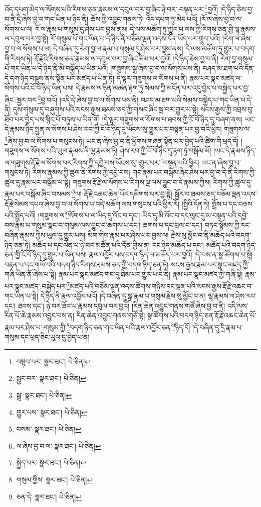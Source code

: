 འོད་དཔག་མེད་ལ་སོགས་པའི་རིགས་ཅན་རྣམས་ལ་དབུལ་བར་བྱ་ཞིང་ཉེ་བར་:བསྟན་པར་\footnote{བསྟབ་པར་  སྣར་ཐང་།  པེ་ཅིན། }བྱའོ། །དེ་ཉིད་ཅེས་བྱ་བ་ནི་དྲི་ཞེས་བྱ་བ་གང་ཡིན་པ་ཉིད་ནི། ཆོས་ཀྱི་འབྱུང་གནས་ཏེ། འོད་དཔག་ཏུ་མེད་པའོ། །རོ་ལ་ཞེས་བྱ་བ་ལ་སོགས་པ་ལ། རོ་ལ་རྣམ་པ་གསུམ་དུ་ཤེས་པར་བྱས་ནས། དེ་ལས་མཆོག་ཏུ་གྱུར་པ་ལས་ཀྱི་རིགས་ཅན་གྱི་ལྷ་རྣམས་ལ་དབུལ་བར་བྱ་སྟེ། རོ་གསུམ་པོ་གང་ཡིན་པ་དེ་ཉིད་ནི་བཅོམ་ལྡན་འདས་དོན་ཡོད་པར་གྲུབ་པའོ། །རེག་ལ་ཞེས་བྱ་བ་ལ་སོགས་པ་ལ། དེ་བཞིན་དུ་རེག་བྱ་ལ་རྣམ་པ་གསུམ་དུ་ཤེས་པར་བྱས་ནས། དེ་ལས་མཆོག་ཏུ་གྱུར་པ་བདག་གི་རིགས་ཏེ། རྡོ་རྗེའི་རིགས་ཅན་རྣམས་ལ་དབུལ་བར་བྱ་ཞིང་ཚིམ་པར་བྱའོ། །དེ་ཉིད་ཅེས་བྱ་བ་ནི། རེག་བྱ་གསུམ་པོ་གང་ཡིན་པ་དེ་ཉིད་ནི་མི་བསྐྱོད་པ་ཡིན་པའོ། །གཟུགས་སྒྲ་ཞེས་བྱ་བ་ལ་སོགས་པས་ནི། བཤད་མ་ཐག་པའི་དོན་དེ་དག་ཉིད་བསྡུས་ནས་སྟོན་པར་མཛད་པ་ཡིན་ཏེ། དེ་ལྟར་གཟུགས་ལ་སོགས་པ་ནི། རྣམ་པར་སྣང་མཛད་ལ་སོགས་པའི་ངོ་བོ་ཉིད་ཡིན་པས། དེ་རྣམས་ལ་ཉིན་མཚན་རྟག་ཏུ་སེམས་ཀྱི་མངོན་པར་འདུ་བྱེད་པ་བསྐྱེད་པར་བྱ་ཞིང་:སྦྱར་བར་\footnote{སྦྱང་བར་  སྣར་ཐང་།  པེ་ཅིན། }བྱ་བའོ། །འདི་དེ་ཞེས་བྱ་བ་ལ་སོགས་པས་ནི། བཤད་མ་ཐག་པའི་སེམས་བསྐྱེད་པ་གང་ཡིན་པ་དེ་ནི། དུས་གསུམ་དུ་བཞུགས་པའི་སངས་རྒྱས་ཐམས་ཅད་ཀྱི་གསང་ཞིང་སྦ་བར་གྱུར་པ་སྟེ། སངས་རྒྱས་ཀྱི་འབྲས་བུ་ཐོབ་པར་བྱེད་པས་སྙིང་པོ་བཏུས་པ་ཡིན་ནོ། །དེ་ལྟར་གཟུགས་ལ་སོགས་པ་ཐབས་ཀྱི་ངོ་བོ་ཉིད་དུ་བཞག་ནས། ཡང་དེ་རྣམས་ཉིད་སྤྱན་ལ་སོགས་པ་ཤེས་རབ་ཀྱི་ངོ་བོ་ཉིད་དུ་ཡོངས་སུ་གྱུར་པར་བསྟན་པར་བྱ་བའི་ཕྱིར། གཟུགས་ལ་\footnote{སྒྲ་  སྣར་ཐང་།  པེ་ཅིན། }ཞེས་བྱ་བ་ལ་སོགས་པ་གསུངས་ཏེ། ཡང་ན་ཞེས་བྱ་བ་ནི་ཕྱོགས་གཞན་སྟོན་པར་བྱེད་པའི་ཚིག་གི་ཕྲད་དོ། །གཟུགས་ལ་སོགས་པའི་ཡུལ་རྣམས་ནི་ལྷ་རྣམས་ཏེ། ཤེས་རབ་ཀྱི་ངོ་བོ་ཉིད་དུ་རྟག་ཏུ་བསྒོམ་མོ། །ཡང་དེ་རྣམས་ཉིད་ལ་གཟུགས་རྡོ་རྗེ་ལ་སོགས་པར་རིགས་ཀྱི་དབྱེ་བས་ཡོངས་སུ་:གྱུར་པར་\footnote{གྱུར་པས་  སྣར་ཐང་།  པེ་ཅིན། }བསྟན་པའི་ཕྱིར། ཡང་ན་ཞེས་བྱ་བ་གསུངས་ཏེ། རིགས་རྣམས་ཀྱི་ཚུལ་ནི་རིགས་ཀྱི་དབྱེ་བས། གང་རྣམ་པར་བསྒོམ་ཞིང་ཤེས་པར་བྱ་བ་དེ་ནི་རིགས་ཀྱི་ཚུལ་དུ་རྣམ་པར་བསྒོམ་པ་སྟེ། གཟུགས་རྡོ་རྗེ་ལ་སོགས་པ་རིགས་ལྔ་ལས་བྱུང་བ་དེ་རྣམས་ཀྱིས། རིགས་ཀྱི་ཚུལ་དུ་རྣམ་པར་བསྒོམ་ཞིང་བསམས་\footnote{བསམ་  སྣར་ཐང་།  པེ་ཅིན། }ལ། རྡོ་རྗེ་འཆང་ཆེན་པོར་དམིགས་པར་བྱ་སྟེ། སྦྱོར་བ་ཐམས་ཅད་བཅོམ་ལྡན་འདས་རྡོ་རྗེ་སེམས་དཔའ་ཞེས་བྱ་བ་ལ་སོགས་པ་བདེ་མཆོག་ལས་གསུངས་པའི་ཕྱིར་རོ། །སྤྱིའི་དོན་ཏེ། སྤྲོས་པ་དང་བཅས་པའི་སྤྱོད་པའོ། །གཟུགས་ལ་\footnote{ལ་ཞེས་བྱ་བ་ལ་  སྣར་ཐང་།  པེ་ཅིན། }སོགས་པ་ལ་ཡིད་དུ་འོང་བ་དང་། ཡིད་དུ་མི་འོང་བ་དང་ལུང་དུ་མ་བསྟན་པའི་དབྱེ་བས་རྣམ་པ་གསུམ་སྣང་བ་གསུམ་ལས་བྱུང་བ་ཆགས་པ་དང་། ཆགས་པ་དང་བྲལ་བ་དང་། བཏང་སྙོམས་ཀྱི་རང་བཞིན་རྣམས་ཀྱིས་ཡུལ་དུ་གྱུར་པས། མིག་གིས་རྣམ་པར་ཤེས་པར་བྱས་ལ། རྗེས་སུ་མྱོང་བ་ནི་མཆོད་པའི་བདག་ཉིད་ཅན་ཏེ། མཆོད་པ་དང་ལེན་པ་ཉེ་བར་མཚོན་པའི་དོན་གྱིས་ན། རང་ཉིད་མཆོད་པ་དང་། མཆོད་པའི་བདག་ཉིད་ཅན་གྱི་ངོ་བོ་ཉིད་དུ་གྱུར་པ་ཡིན་པས། རྣལ་འབྱོར་པས་བདག་ཉིད་ལ་མཆོད་པར་བྱའོ། །དེ་བས་ན་སྣ་ཚོགས་པ་སྟེ། བརྟན་པ་དང་གཡོ་བའི་བདག་ཉིད་རིགས་ཐམས་ཅད་ཀྱི་བདག་ཉིད་ཅན་ཏེ། སངས་རྒྱས་རྣམ་པར་སྣང་མཛད་ཀྱི་གཞི་ཡིན་ནོ་ཞེས་པ་སྟེ། རྣམ་པར་སྣང་མཛད་གང་དུ་ཐིམ་པར་གྱུར་པ་དེ་ནི། རྣམ་པར་སྣང་མཛད་ཀྱི་གཞི་སྟེ། རྣམ་པར་སྣང་མཛད་:བསྐྱེད་པར་\footnote{སྐྱེད་པར་  སྣར་ཐང་།  པེ་ཅིན། }མཛད་པའི་བཅོམ་ལྡན་འདས་ཚོགས་གཉིས་དང་ལྡན་པའི་སངས་རྒྱས་རྡོ་རྗེ་འཆང་བ་གང་ཡིན་པ་སྟེ། དེ་ཉིད་ནི་རྣལ་འབྱོར་པའོ། །དེ་བཞིན་དུ་སྒྲ་རྣམ་པ་གསུམ་རྗེས་སུ་མྱོང་བ་ན། ལྷ་རྣམས་ལ་ཤེས་རབ་དང་། ཐབས་དང་། ཉེ་བར་ཐོབ་པ་རྣམས་དབུལ་བར་བྱའོ། །རིན་ཆེན་འབྱུང་གནས་གཙོ་ཞེས་བྱ་བ་ནི། འདི་ལས་རིན་པོ་ཆེ་རྣམས་འབྱུང་བས་ན། རིན་ཆེན་འབྱུང་གནས་གཙོ་སྟེ། སྣ་ཚོགས་པའི་བདག་ཉིད་ཅན་རྡོ་རྗེ་འཆང་ཆེན་པོ་རྣམ་པར་ཤེས་པ་:གསུམ་གྱི་\footnote{གསུམ་གྱིས་  སྣར་ཐང་།  པེ་ཅིན། }བདག་ཉིད་ཅན་གང་ཡིན་པའི་རྣལ་འབྱོར་ཅན་\footnote{ཅན་དེ་  སྣར་ཐང་།  པེ་ཅིན། }ཉིད་དོ། །དེ་བཞིན་དུ་དྲི་རྣམ་པ་གསུམ་དང་ཕྲད་ཅིང་ཡུལ་དུ་བྱེད་པ་ན། 